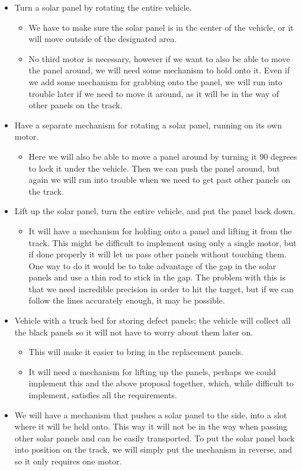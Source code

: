 \begin{itemize}
\itemsep1pt\parskip0pt
\item
  Turn a solar panel by rotating the entire vehicle.
\begin{itemize}
\item
  We have to make sure the solar panel is in the center of the vehicle,
  or it will move outside of the designated area.
\item
  No third motor is necessary, however if we want to also be able to
  move the panel around, we will need some mechanism to hold onto it.
  Even if we add some mechanism for grabbing onto the panel, we will run
  into trouble later if we need to move it around, as it will be in the
  way of other panels on the track.
\end{itemize}
\item
  Have a separate mechanism for rotating a solar panel, running on its
  own motor.
\begin{itemize}
\item
  Here we will also be able to move a panel around by turning it 90
  degrees to lock it under the vehicle. Then we can push the panel
  around, but again we will run into trouble when we need to get past
  other panels on the track.
  \end{itemize}
\item
  Lift up the solar panel, turn the entire vehicle, and put the panel
  back down.
\begin{itemize}
\item
  It will have a mechanism for holding onto a panel and lifting it from
  the track. This might be difficult to implement using only a single
  motor, but if done properly it will let us pass other panels without
  touching them. One way to do it would be to take advantage of the gap
  in the solar panels and use a thin rod to stick in the gap. The
  problem with this is that we need incredible precision in order to hit
  the target, but if we can follow the lines accurately enough, it may
  be possible.
\end{itemize}
\item
  Vehicle with a truck bed for storing defect panels; the vehicle will
  collect all the black panels so it will not have to worry about them
  later on.
\begin{itemize}
\item
  This will make it easier to bring in the replacement panels.
\item
  It will need a mechanism for lifting up the panels, perhaps we could
  implement this and the above proposal together, which, while difficult
  to implement, satisfies all the requirements.
\end{itemize}
\item
  We will have a mechanism that pushes a solar panel to the side, into a
  slot where it will be held onto. This way it will not be in the way
  when passing other solar panels and can be easily transported. To put
  the solar panel back into position on the track, we will simply put
  the mechanism in reverse, and so it only requires one motor.
\end{itemize}

